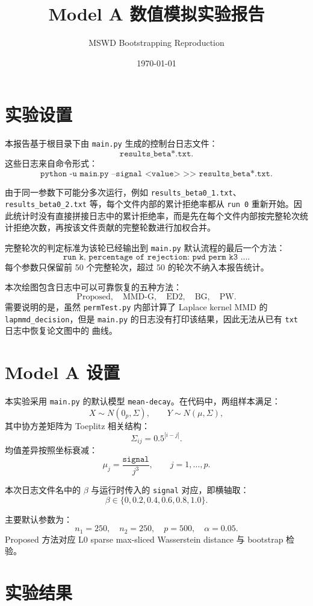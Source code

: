 \documentclass[UTF8,a4paper,11pt]{ctexart}
\title{Model A 数值模拟实验报告}
\author{MSWD Bootstrapping Reproduction}
\date{\today}
\begin{document}
\maketitle

\section{实验设置}

本报告基于根目录下由 \texttt{main.py} 生成的控制台日志文件：
\[
\texttt{results\_beta*.txt}.
\]
这些日志来自命令形式：
\[
\texttt{python -u main.py --signal <value> >> results\_beta*.txt}.
\]

由于同一参数下可能分多次运行，例如 \texttt{results\_beta0\_1.txt}、
\texttt{results\_beta0\_2.txt} 等，每个文件内部的累计拒绝率都从 \texttt{run 0}
重新开始。因此统计时没有直接拼接日志中的累计拒绝率，而是先在每个文件内部按完整轮次统计拒绝次数，再按该文件贡献的完整轮数进行加权合并。

完整轮次的判定标准为该轮已经输出到 \texttt{main.py} 默认流程的最后一个方法：
\[
\texttt{run k, percentage of rejection: pwd perm k3 ...}.
\]
每个参数只保留前 50 个完整轮次，超过 50 的轮次不纳入本报告统计。

本次绘图包含日志中可以可靠恢复的五种方法：
\[
\text{Proposed},\quad \text{MMD-G},\quad \text{ED2},\quad \text{BG},\quad \text{PW}.
\]
需要说明的是，虽然 \texttt{permTest.py} 内部计算了 Laplace kernel MMD 的
\texttt{lapmmd\_decision}，但是 \texttt{main.py} 的日志没有打印该结果，因此无法从已有
\texttt{txt} 日志中恢复论文图中的  曲线。

\section{Model A 设置}

本实验采用 \texttt{main.py} 的默认模型 \texttt{mean-decay}。在代码中，两组样本满足：
\[
X \sim N(0_p, \Sigma), \qquad
Y \sim N(\mu, \Sigma),
\]
其中协方差矩阵为 Toeplitz 相关结构：
\[
\Sigma_{ij}=0.5^{|i-j|}.
\]
均值差异按照坐标衰减：
\[
\mu_j = \frac{\texttt{signal}}{j^3}, \qquad j=1,\ldots,p.
\]

本次日志文件名中的 \(\beta\) 与运行时传入的 \texttt{signal} 对应，即横轴取：
\[
\beta \in \{0, 0.2, 0.4, 0.6, 0.8, 1.0\}.
\]

主要默认参数为：
\[
n_1=250,\quad n_2=250,\quad p=500,\quad \alpha=0.05.
\]
Proposed 方法对应 L0 sparse max-sliced Wasserstein distance 与 bootstrap 检验。

\section{实验结果}
\end{document}
